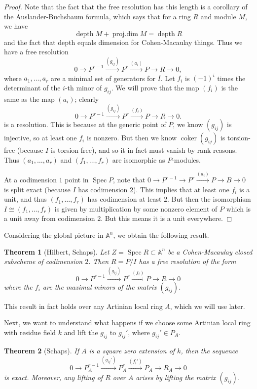 \documentclass{amsart}
\newtheorem{thm}{Theorem}[section]
\theoremstyle{definition}
\theoremstyle{remark}
\theoremstyle{plain}
\theoremstyle{definition}
\theoremstyle{remark}
\newcommand{\A}{\mathbb{A}}
\newcommand{\1}{\mathbf{1}}
\newcommand{\2}{\mathbf{2}}
\newcommand{\3}{\mathbf{3}}
\DeclareMathOperator{\depth}{depth}
\DeclareMathOperator{\Spec}{Spec}
\DeclareMathOperator{\coker}{coker}
\begin{document}
\begin{proof}
    Note that the fact that the free resolution has this length is a corollary of the Auslander-Buchsbaum formula, which says that for a ring $R$ and module $M$, we have
    \[ \depth M + \operatorname{proj.dim} M = \depth R \]
    and the fact that depth equals dimension for Cohen-Macaulay things. Thus we have a free resolution
    \[ 0 \to P^{r-1} \xrightarrow{(g_{ij})} P^r \xrightarrow{(a_i)} P \to R \to 0, \]
    where $a_1, \ldots, a_r$ are a minimal set of generators for $I$. Let $f_i$ is ${(-1)}^i$ times the determinant of the $i$-th minor of $g_{ij}$. We will prove that the map $(f_i)$ is the same as the map $(a_i)$; clearly
    \[ 0 \to P^{r-1} \xrightarrow{(g_{ij})} P^r \xrightarrow{(f_i)} P \to R \to 0. \]
    is a resolution. This is because at the generic point of $P$, we know $(g_{ij})$ is injective, so at least one $f_i$ is nonzero. But then we know $\coker (g_{ij})$ is torsion-free (because $I$ is torsion-free), and so it in fact must vanish by rank reasons. Thus $(a_1, \ldots, a_{r})$ and $(f_1, \ldots, f_{r})$ are isomorphic as $P$-modules.

    At a codimension $1$ point in $\Spec P$, note that $0 \to P^{r-1} \to P^r \xrightarrow{(a_i)} P \to B \to 0$ is split exact (because $I$ has codimension $2$). This implies that at least one $f_i$ is a unit, and thus $(f_1, \ldots, f_r)$ has codimension at least $2$. But then the isomorphism $I \cong (f_1, \ldots, f_r)$ is given by multiplication by some nonzero element of $P$ which is a unit away from codimension $2$. But this means it is a unit everywhere.
\end{proof}

Considering the global picture in $\A^n$, we obtain the following result.
\begin{thm}[Hilbert, Schaps]
    Let $Z = \Spec R \subset \A^n$ be a Cohen-Macaulay closed subscheme of codimension $2$. Then $R = P/I$ has a free resolution of the form
    \[ 0 \to P^{r-1} \xrightarrow{(g_{ij})} P^r \xrightarrow{(f_i)} P \to R \to 0 \]
    where the $f_i$ are the maximal minors of the matrix $(g_{ij})$.
\end{thm}

This result in fact holds over any Artinian local ring $A$, which we will use later.

Next, we want to understand what happens if we choose some Artinian local ring with residue field $k$ and lift the $g_{ij}$ to $g_{ij}'$, where $g_{ij}' \in P_A$.

\begin{thm}[Schaps]
    If $A$ is a square zero extension of $k$, then the sequence
    \[ 0 \to P_A^{r-1} \xrightarrow{(g_{ij}')} P_A^r \xrightarrow{(f_i')} P_A \to R_A \to 0 \]
    is exact. Moreover, any lifting of $R$ over $A$ arises by lifting the matrix $(g_{ij})$.
\end{thm}
\end{document}
